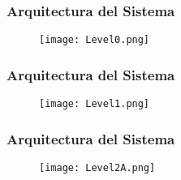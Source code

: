 \begin{frame}
    \frametitle{Arquitectura del Sistema}

    \begin{figure}[H]
        \centering
        \texttt{[image: Level0.png]} %
        \label{fig:level0DF}
    \end{figure}
\end{frame}

\begin{frame}
    \frametitle{Arquitectura del Sistema}
    \begin{figure}[H]
        \centering
        \texttt{[image: Level1.png]} %
        \label{fig:level0DF}
    \end{figure}
\end{frame}

\begin{frame}
    \frametitle{Arquitectura del Sistema}

    \begin{figure}[H]
        \centering
        \texttt{[image: Level2A.png]} %
        \label{fig:level0DF}
    \end{figure}
\end{frame}


